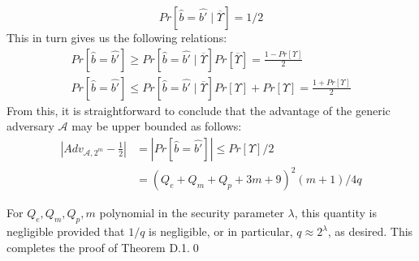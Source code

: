 \begin{equation}
 Pr[\hat{b}=\hat{b'}\mid\overline{\Upsilon}]=1/2\nonumber
\end{equation}
\noindent This in turn gives us the following relations:
\begin{eqnarray}
 Pr[\hat{b}=\hat{b'}]\geq Pr[\hat{b}=\hat{b'}\mid\overline{\Upsilon}]Pr[\overline{\Upsilon}]=\frac{1-Pr[\Upsilon]}{2}\nonumber\\
 Pr[\hat{b}=\hat{b'}]\leq Pr[\hat{b}=\hat{b'}\mid\overline{\Upsilon}]Pr[\Upsilon] + Pr[{\Upsilon}] = \frac{1+Pr[\Upsilon]}{2}\nonumber
\end{eqnarray}
\noindent From this, it is straightforward to conclude that the advantage of the generic adversary $\mathcal{A}$ may be upper bounded as follows:
\begin{equation}
\begin{split}
 |Adv_{\mathcal{A},2^m}-\frac{1}{2}| &= |Pr[\hat{b}=\hat{b'}]|\leq {Pr[\Upsilon]}/{2}\\
 &= \left(Q_e+Q_m+Q_p+3m+9\right)^2\left(m+1\right)/4q\nonumber
\end{split} 
\end{equation}

\noindent For $Q_e,Q_m,Q_p,m$ polynomial in the security parameter $\lambda$, this quantity is negligible provided that $1/q$ is negligible, or in particular, $q\approx 2^{\lambda}$, as desired. This completes the proof of Theorem D.1.\hfill\qed 